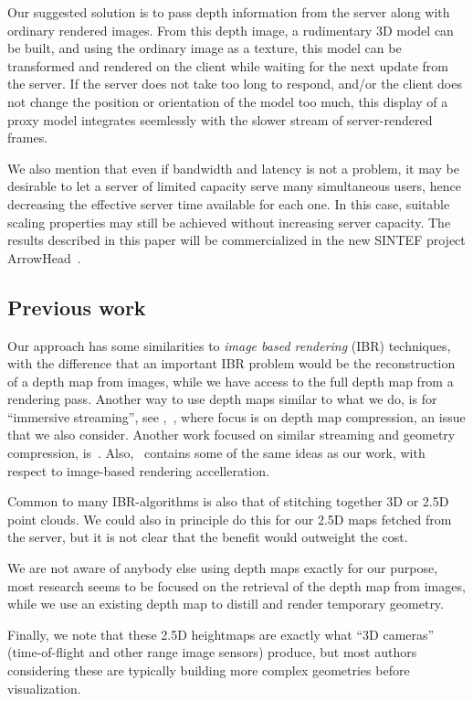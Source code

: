 Our suggested solution is to pass depth information from the server along with
ordinary rendered images. From this depth image, a rudimentary 3D model can be
built, and using the ordinary image as a texture, this model can be transformed
and rendered on the client while waiting for the next update from the server. If
the server does not take too long to respond, and/or the client does not change
the position or orientation of the model too much, this display of a proxy model
integrates seemlessly with the slower stream of server-rendered frames.

We also mention that even if bandwidth and latency is not a problem, it may be
desirable to let a server of limited capacity serve many simultaneous users,
hence decreasing the effective server time available for each one. In this case,
suitable scaling properties may still be achieved without increasing server
capacity. The results described in this paper will be commercialized in the new
SINTEF project \mbox{ArrowHead}~\cite{arrowhead}.

\subsection{Previous work}
\label{sec:prevWork}

Our approach has some similarities to {\em image based rendering} (IBR)
techniques, with the difference that an important IBR problem would be the
reconstruction of a depth map from images, while we have access to the full
depth map from a rendering pass.  Another way to use depth maps similar to what
we do, is for ``immersive streaming'', see \eg,~\cite{ibr}, where focus is on
depth map compression, an issue that we also consider. {\color{red}Another work
focused on similar streaming and geometry compression,
is~\cite{teler}. Also,~\cite{220764} contains some of the same ideas as our
work, with respect to image-based rendering accelleration.}

Common to many IBR-algorithms is also that of stitching together 3D or 2.5D
point clouds. We could also in principle do this for our 2.5D maps fetched from
the server, but it is not clear that the benefit would outweight the
cost.

We are not aware of anybody else using depth maps exactly for our purpose, most
research seems to be focused on the retrieval of the depth map from images,
while we use an existing depth map to distill and render temporary geometry.

{\color{red}Finally, we note that these 2.5D heightmaps are exactly what ``3D cameras''
(time-of-flight and other range image sensors) produce, but most authors
considering these are typically building more complex geometries before
visualization.} %


